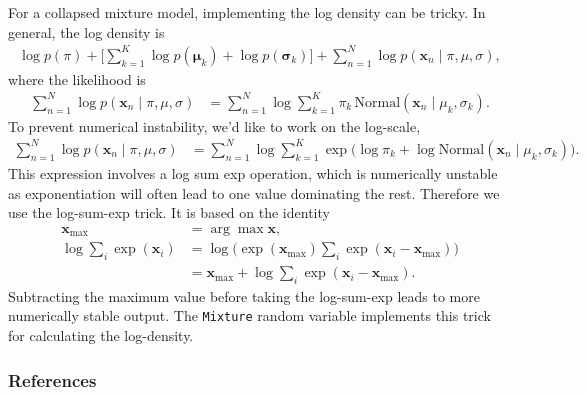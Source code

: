 For a collapsed mixture model, implementing the log density can be tricky.
In general, the log density is
\begin{align*}
  \log p(\pi) +
  \Big[ \sum_{k=1}^K \log p(\mathbf{\mu}_k) + \log
  p(\mathbf{\sigma}_k) \Big] +
  \sum_{n=1}^N \log p(\mathbf{x}_n \mid \pi, \mu, \sigma),
\end{align*}
where the likelihood is
\begin{align*}
  \sum_{n=1}^N \log p(\mathbf{x}_n \mid \pi, \mu, \sigma)
  &=
  \sum_{n=1}^N \log \sum_{k=1}^K \pi_k \, \text{Normal}(\mathbf{x}_n \mid
  \mu_k, \sigma_k).
\end{align*}
To prevent numerical instability, we'd like to work on the log-scale,
\begin{align*}
  \sum_{n=1}^N \log p(\mathbf{x}_n \mid \pi, \mu, \sigma)
  &=
  \sum_{n=1}^N \log \sum_{k=1}^K \exp\Big(
  \log \pi_k + \log \text{Normal}(\mathbf{x}_n \mid \mu_k, \sigma_k)\Big).
\end{align*}
This expression involves a log sum exp operation, which is
numerically unstable as exponentiation will often lead to one value
dominating the rest. Therefore we use the log-sum-exp trick.
It is based on the identity
\begin{align*}
  \mathbf{x}_{\mathrm{max}}
  &=
  \arg\max \mathbf{x},
  \\
  \log \sum_i \exp(\mathbf{x}_i)
  &=
  \log \Big(\exp(\mathbf{x}_{\mathrm{max}}) \sum_i \exp(\mathbf{x}_i -
  \mathbf{x}_{\mathrm{max}})\Big)
  \\
  &=
  \mathbf{x}_{\mathrm{max}} + \log \sum_i \exp(\mathbf{x}_i -
  \mathbf{x}_{\mathrm{max}}).
\end{align*}
Subtracting the maximum value before taking the log-sum-exp leads to
more numerically stable output. The \texttt{Mixture} random variable
implements this trick for calculating the log-density.

\subsubsection{References}\label{references}
